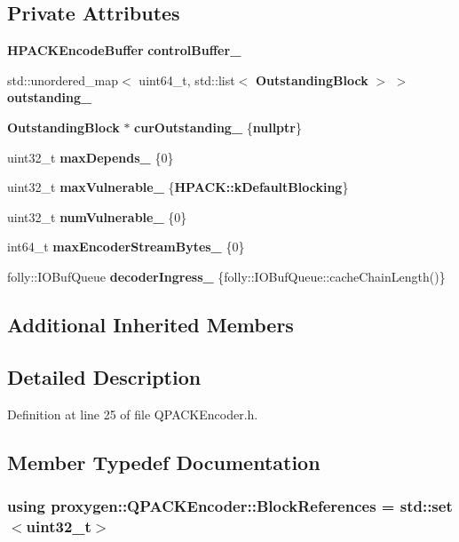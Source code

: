 \subsection*{Private Attributes}
\begin{DoxyCompactItemize}
\item 
{\bf H\+P\+A\+C\+K\+Encode\+Buffer} {\bf control\+Buffer\+\_\+}
\item 
std\+::unordered\+\_\+map$<$ uint64\+\_\+t, std\+::list$<$ {\bf Outstanding\+Block} $>$ $>$ {\bf outstanding\+\_\+}
\item 
{\bf Outstanding\+Block} $\ast$ {\bf cur\+Outstanding\+\_\+} \{{\bf nullptr}\}
\item 
uint32\+\_\+t {\bf max\+Depends\+\_\+} \{0\}
\item 
uint32\+\_\+t {\bf max\+Vulnerable\+\_\+} \{{\bf H\+P\+A\+C\+K\+::k\+Default\+Blocking}\}
\item 
uint32\+\_\+t {\bf num\+Vulnerable\+\_\+} \{0\}
\item 
int64\+\_\+t {\bf max\+Encoder\+Stream\+Bytes\+\_\+} \{0\}
\item 
folly\+::\+I\+O\+Buf\+Queue {\bf decoder\+Ingress\+\_\+} \{folly\+::\+I\+O\+Buf\+Queue\+::cache\+Chain\+Length()\}
\end{DoxyCompactItemize}
\subsection*{Additional Inherited Members}


\subsection{Detailed Description}


Definition at line 25 of file Q\+P\+A\+C\+K\+Encoder.\+h.



\subsection{Member Typedef Documentation}
\subsubsection[{Block\+References}]{\setlength{\rightskip}{0pt plus 5cm}using {\bf proxygen\+::\+Q\+P\+A\+C\+K\+Encoder\+::\+Block\+References} =  std\+::set$<$uint32\+\_\+t$>$\hspace{0.3cm}{\ttfamily [private]}}\label{classproxygen_1_1QPACKEncoder_a4df67ad35809ff47de76fe1ab6ec120b}


